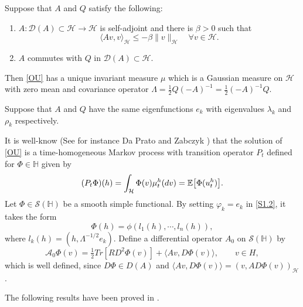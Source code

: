 \documentclass[review, onefignum, onetabnum]{siamart171218}
\begin{document}
\begin{lemma} \label{lemma-AQ}
    Suppose that $A$ and $Q$ satisfy the following:
    \begin{enumerate}
        \item
            $A:\mathcal{D}(A)\subset \mathcal{H}\rightarrow \mathcal{H}$ is
            self-adjoint and there is $\beta>0$ such that
            \[
                \langle Av,v\rangle_ \mathcal{H}\le -\beta\|v
                \|_\mathcal{H}\quad
                \forall v\in \mathcal{H}.
            \]
        \item $A$ commutes with $Q$ in $\mathcal{D}(A)\subset \mathcal{H}$.
    \end{enumerate}
    Then \eqref{OU} has a unique invariant measure $\mu$ which is a Gaussian
    measure on $ \mathcal{H}$ with zero mean and covariance
    operator
    $
        \Lambda=
            \tfrac{1}{2}Q(-A)^{-1}
            =\tfrac{1}{2}(-A)^{-1}Q
    $.

\end{lemma}


Suppose that $A$ and $Q$ have the same eigenfunctions $e_k$ with eigenvalues
$\lambda_k$ and $\rho_k$ respectively.

    It is well-know (See for instance Da Prato and Zabczyk \cite{da-za}) that
the solution of \eqref{OU} is a time-homogeneous Markov process with transition
operator $P_t$  defined for $\Phi\in\mathbb{H}$ given by
\begin{equation}
    (P_t\Phi)(h)=
        \int_{\mathcal{H}}
             \Phi(v) \mu_t ^ h(dv)
             = \mathbb{E}
             \big[
                \Phi(u_t^h)
             \big].
\end{equation}
    Let $\Phi\in\mathcal{S}(\mathbb{H})$ be a smooth simple functional. By
setting $\varphi_k = e_k$ in \eqref{S1.2}, it takes the form
\[
  \Phi(h) = \phi(l_1(h), \cdots, l_n (h)),
\]
where $l_k(h) = (h, \Lambda^{-1/2} e_k )$. Define a differential operator
$A_0$
on $\mathcal{S}(\mathbb{H})$ by
\begin{equation}\label{def-A0}
  \mathcal{A}_0
    \Phi(v) = \tfrac{1}{2}Tr [RD^2 \Phi(v)] + \langle Av, D\Phi(v)\rangle
    ,\qquad v \in H,
 \end{equation}
which is well defined, since $D\Phi \in D(A)$ and
$\langle Av, D\Phi(v)\rangle = (v, A D \Phi(v))_\mathcal{H}$.

The following results have been proved in \cite{liu}.
\end{document}
